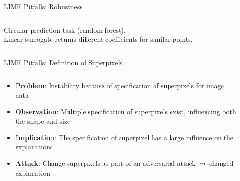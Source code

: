 \documentclass[11pt,compress,t,notes=noshow, aspectratio=169, xcolor=table]{beamer}
\begin{document}
\begin{vbframe}[c]{LIME Pitfalls: Robustness }
\begin{columns}
\begin{column}{0.48\textwidth}
\begin{center}
	{Circular prediction task (random forest). \\Linear surrogate returns different coefficients for similar points.}
	
	\end{center}
\end{column}
\end{columns}
\end{vbframe}

\begin{vbframe}{LIME Pitfalls: Definition of Superpixels }

\begin{columns}
    
    \begin{column}{0.6\textwidth}
        
        \begin{itemize}
        	\item \textbf{Problem}: Instability because of specification of superpixels for image data 
        	\item \textbf{Observation}: Multiple specification of superpixels exist, influencing both the shape and size 
        	\item \textbf{Implication}: The specification of superpixel has a large influence on the explanations 
        	\item \textbf{Attack}: Change superpixels as part of an adversarial attack $\leadsto$ changed explanation
        \end{itemize}
        
    \end{column}
    
    \begin{column}{0.4\textwidth}
    

\end{column}
\end{columns}
\end{vbframe}
\end{document}
